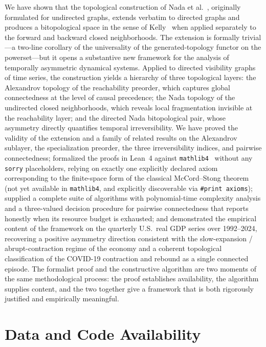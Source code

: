 \documentclass[11pt,a4paper]{article}
\theoremstyle{plain}
\theoremstyle{definition}
\begin{document}
We have shown that the topological construction of
Nada et al.~\cite{Nada2018}, originally formulated for undirected
graphs, extends verbatim to directed graphs and produces a
bitopological space in the sense of Kelly~\cite{Kelly1963} when
applied separately to the forward and backward closed neighborhoods.
The extension is formally trivial---a two-line corollary of the
universality of the generated-topology functor on the powerset---but
it opens a substantive new framework for the analysis of temporally
asymmetric dynamical systems. Applied to directed visibility graphs of
time series, the construction yields a hierarchy of three topological
layers: the Alexandrov topology of the reachability preorder, which
captures global connectedness at the level of causal precedence; the
Nada topology of the undirected closed neighborhoods, which reveals
local fragmentation invisible at the reachability layer; and the
directed Nada bitopological pair, whose asymmetry directly quantifies
temporal irreversibility. We have proved the validity of the extension
and a family of related results on the Alexandrov sublayer, the
specialization preorder, the three irreversibility indices, and
pairwise connectedness; formalized the proofs in Lean~4 against
\texttt{mathlib4}~\cite{mathlib} without any \texttt{sorry}
placeholders, relying on exactly one explicitly declared axiom
corresponding to the finite-space form of the classical McCord--Stong
theorem~\cite{McCord1966,Stong1966} (not yet available in
\texttt{mathlib4}, and explicitly discoverable via
\texttt{\#print axioms}); supplied a complete suite of algorithms with
polynomial-time complexity analysis and a three-valued decision
procedure for pairwise connectedness that reports honestly when its
resource budget is exhausted; and demonstrated the empirical content
of the framework on the quarterly U.S.\ real GDP series over
1992--2024, recovering a positive asymmetry direction consistent with
the slow-expansion / abrupt-contraction regime of the economy and a
coherent topological classification of the COVID-19 contraction and
rebound as a single connected episode. The formalist proof and the
constructive algorithm are two moments of the same methodological
process: the proof establishes availability, the algorithm supplies
content, and the two together give a framework that is both rigorously
justified and empirically meaningful.



\section*{Data and Code Availability}
\end{document}
